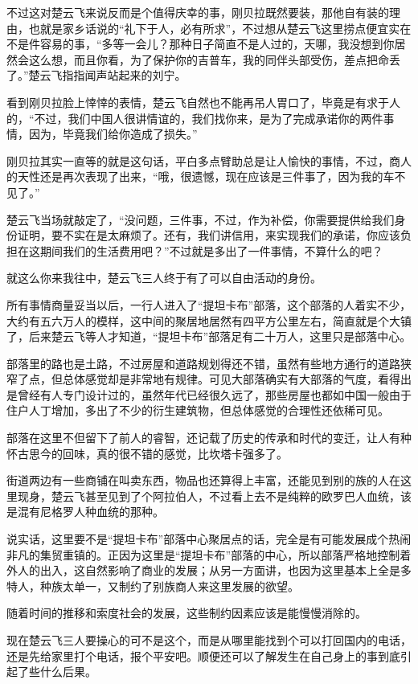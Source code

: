 不过这对楚云飞来说反而是个值得庆幸的事，刚贝拉既然要装，那他自有装的理由，也就是家乡话说的“礼下于人，必有所求”，不过想从楚云飞这里捞点便宜实在不是件容易的事，“多等一会儿？那种日子简直不是人过的，天哪，我没想到你居然会这么想，而且你看，为了保护你的吉普车，我的同伴头部受伤，差点把命丢了。”楚云飞指指闻声站起来的刘宁。

看到刚贝拉脸上悻悻的表情，楚云飞自然也不能再吊人胃口了，毕竟是有求于人的，“不过，我们中国人很讲情谊的，我们找你来，是为了完成承诺你的两件事情，因为，毕竟我们给你造成了损失。”

刚贝拉其实一直等的就是这句话，平白多点臂助总是让人愉快的事情，不过，商人的天性还是再次表现了出来，“哦，很遗憾，现在应该是三件事了，因为我的车不见了。”

楚云飞当场就敲定了，“没问题，三件事，不过，作为补偿，你需要提供给我们身份证明，要不实在是太麻烦了。还有，我们讲信用，来实现我们的承诺，你应该负担在这期间我们的生活费用吧？”不过就是多出了一件事情，不算什么的吧？

就这么你来我往中，楚云飞三人终于有了可以自由活动的身份。

所有事情商量妥当以后，一行人进入了“提坦卡布”部落，这个部落的人着实不少，大约有五六万人的模样，这中间的聚居地居然有四平方公里左右，简直就是个大镇了，后来楚云飞等人才知道，“提坦卡布”部落足有二十万人，这里只是部落中心。

部落里的路也是土路，不过房屋和道路规划得还不错，虽然有些地方通行的道路狭窄了点，但总体感觉却是非常地有规律。可见大部落确实有大部落的气度，看得出是曾经有人专门设计过的，虽然年代已经很久远了，那些房屋也都如中国一般由于住户人丁增加，多出了不少的衍生建筑物，但总体感觉的合理性还依稀可见。

部落在这里不但留下了前人的睿智，还记载了历史的传承和时代的变迁，让人有种怀古思今的回味，真的很不错的感觉，比坎塔卡强多了。

街道两边有一些商铺在叫卖东西，物品也还算得上丰富，还能见到别的族的人在这里现身，楚云飞甚至见到了个阿拉伯人，不过看上去不是纯粹的欧罗巴人血统，该是混有尼格罗人种血统的那种。

说实话，这里要不是“提坦卡布”部落中心聚居点的话，完全是有可能发展成个热闹非凡的集贸重镇的。正因为这里是“提坦卡布”部落的中心，所以部落严格地控制着外人的出入，这自然影响了商业的发展；从另一方面讲，也因为这里基本上全是多特人，种族太单一，又制约了别族商人来这里发展的欲望。

随着时间的推移和索度社会的发展，这些制约因素应该是能慢慢消除的。

现在楚云飞三人要操心的可不是这个，而是从哪里能找到个可以打回国内的电话，还是先给家里打个电话，报个平安吧。顺便还可以了解发生在自己身上的事到底引起了些什么后果。

